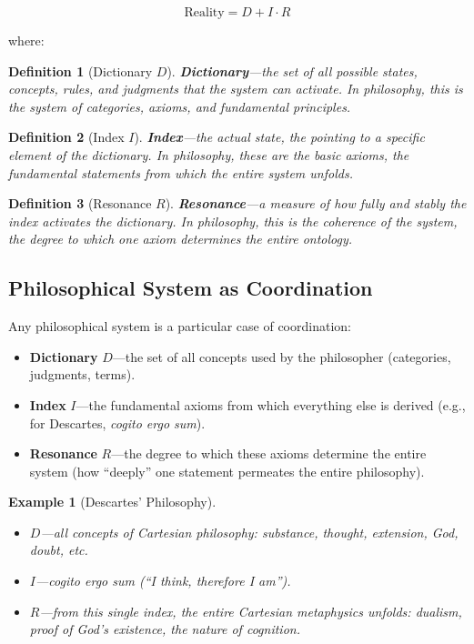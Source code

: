 \documentclass[12pt,a4paper]{article}
\newtheorem{definition}{Definition}[section]
\newtheorem{example}{Example}[section]
\begin{document}
	\begin{equation}
		\boxed{\text{Reality} = D + I \cdot R}
	\end{equation}
	
	where:
	
	\begin{definition}[Dictionary \(D\)]
		\textbf{Dictionary}—the set of all possible states, concepts, rules, and judgments that the system can activate. In philosophy, this is the system of categories, axioms, and fundamental principles.
	\end{definition}
	
	\begin{definition}[Index \(I\)]
		\textbf{Index}—the actual state, the pointing to a specific element of the dictionary. In philosophy, these are the basic axioms, the fundamental statements from which the entire system unfolds.
	\end{definition}
	
	\begin{definition}[Resonance \(R\)]
		\textbf{Resonance}—a measure of how fully and stably the index activates the dictionary. In philosophy, this is the coherence of the system, the degree to which one axiom determines the entire ontology.
	\end{definition}
	
	\subsection{Philosophical System as Coordination}
	
	Any philosophical system is a particular case of coordination:
	
	\begin{itemize}
		\item \textbf{Dictionary} \(D\)—the set of all concepts used by the philosopher (categories, judgments, terms).
		\item \textbf{Index} \(I\)—the fundamental axioms from which everything else is derived (e.g., for Descartes, \textit{cogito ergo sum}).
		\item \textbf{Resonance} \(R\)—the degree to which these axioms determine the entire system (how ``deeply'' one statement permeates the entire philosophy).
	\end{itemize}
	
	\begin{example}[Descartes' Philosophy]
		\begin{itemize}
			\item \(D\)—all concepts of Cartesian philosophy: substance, thought, extension, God, doubt, etc.
			\item \(I\)—\textit{cogito ergo sum} (``I think, therefore I am'').
			\item \(R\)—from this single index, the entire Cartesian metaphysics unfolds: dualism, proof of God's existence, the nature of cognition.
		\end{itemize}
	\end{example}
	
\end{document}
